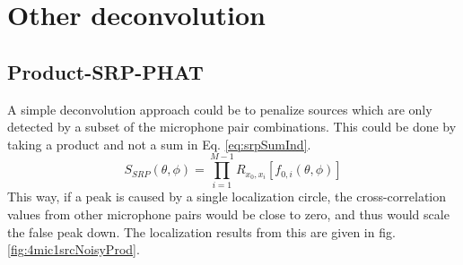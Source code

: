 \chapter{Other deconvolution}
\section{Product-SRP-PHAT}
A simple deconvolution approach could be to penalize sources which are only detected by a subset of the microphone pair combinations. This could be done by taking a product and not a sum in Eq. \ref{eq:srpSumInd}.
\begin{equation}
    S_{SRP}(\theta,\phi)=\prod\limits_{i=1}^{M-1}{R_{x_0,x_i}[f_{0,i}(\theta,\phi)]}
     \label{eq:srpProdInd}
\end{equation}
This way, if a peak is caused by a single localization circle, the cross-correlation values from other microphone pairs would be close to zero, and thus would scale the false peak down. The localization results from this are given in fig. \ref{fig:4mic1srcNoisyProd}.
